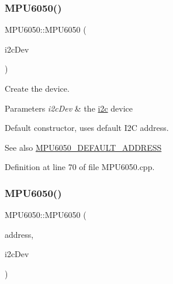 \subsubsection{\texorpdfstring{MPU6050()}{MPU6050()}\hspace{0.1cm}{\footnotesize\ttfamily [1/2]}}
{\footnotesize\ttfamily M\+P\+U6050\+::\+M\+P\+U6050 (\begin{DoxyParamCaption}\item[{\mbox{\hyperlink{classI2Cdev}{I2\+Cdev}} \&}]{i2c\+Dev }\end{DoxyParamCaption})}

Create the device.


\begin{DoxyParams}{Parameters}
{\em i2c\+Dev} & the \mbox{\hyperlink{namespacei2c}{i2c}} device\\
\hline
\end{DoxyParams}
Default constructor, uses default I2C address. \begin{DoxySeeAlso}{See also}
\mbox{\hyperlink{MPU6050_8h_ae5cf60bf2cbc13d21384c215c4f05149}{M\+P\+U6050\+\_\+\+D\+E\+F\+A\+U\+L\+T\+\_\+\+A\+D\+D\+R\+E\+SS}} 
\end{DoxySeeAlso}


Definition at line 70 of file M\+P\+U6050.\+cpp.


\begin{DoxyCode}{0}

\end{DoxyCode}
\mbox{\label{classMPU6050_a9d3322e6f83e4642d01cd0e878bdabf0}} 
\subsubsection{\texorpdfstring{MPU6050()}{MPU6050()}\hspace{0.1cm}{\footnotesize\ttfamily [2/2]}}
{\footnotesize\ttfamily M\+P\+U6050\+::\+M\+P\+U6050 (\begin{DoxyParamCaption}\item[{uint8\+\_\+t}]{address,  }\item[{\mbox{\hyperlink{classI2Cdev}{I2\+Cdev}} \&}]{i2c\+Dev }\end{DoxyParamCaption})}

